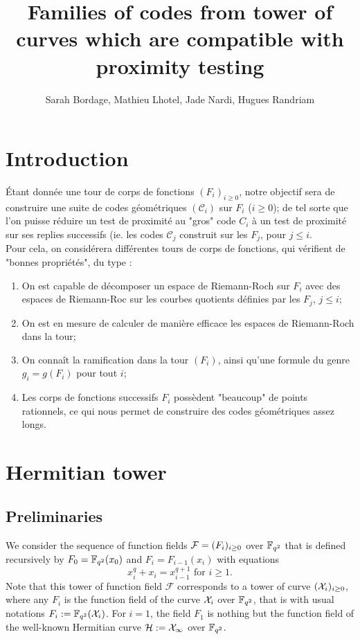 \documentclass[10pt]{article}
\title{Families of codes from tower of curves which are compatible with proximity testing}
\author{Sarah Bordage, Mathieu Lhotel, Jade Nardi, Hugues Randriam}
\begin{document}
\maketitle

\section{Introduction}

Étant donnée une tour de corps de fonctions $(F_i)_{i \geq 0}$, notre objectif sera de construire une suite de codes géométriques $(\mathcal{C}_i)$ sur $F_i$ ($i \geq 0$); de tel sorte que l'on puisse réduire un test de proximité au "gros" code $C_i$ à un test de proximité sur ses replies successifs (ie. les codes $\mathcal{C}_j$ construit sur les $F_j$, pour $j \leq i$. \\
Pour cela, on considérera différentes tours de corps de fonctions, qui vérifient de "bonnes propriétés", du type :
\begin{enumerate}
\item On est capable de décomposer un espace de Riemann-Roch sur $F_i$ avec des espaces de Riemann-Roc sur les courbes quotients définies par les $F_j$, $j \leq i$;
\item On est en mesure de calculer de manière efficace les espaces de Riemann-Roch dans la tour;
\item On connaît la ramification dans la tour $(F_i)$, ainsi qu'une formule du genre $g_i = g(F_i)$ pour tout $i$;
\item Les corps de fonctions successifs $F_i$ possèdent "beaucoup" de points rationnels, ce qui nous permet de construire des codes géométriques assez longs.
\end{enumerate}



\section{Hermitian tower}

\subsection{Preliminaries}

We consider the sequence of function fields $\mathcal{F}=(F_i)_{i\geq 0}$ over $\mathbb{F}_{q^2}$ that is defined recursively by $F_0=\mathbb{F}_{q^2}(x_0)$ and $F_i = F_{i-1}(x_i)$ with equations
\[x_i^q+x_{i} = x_{i-1}^{q+1} \text{ for } i\geq 1.\]
Note that this tower of function field $\mathcal{F}$ corresponds to a tower of curve
$(\mathcal{X}_i)_{i\geq 0}$, where any $F_i$ is the function field of the curve $\mathcal{X}_i$ over $\mathbb{F}_{q^2}$, that is with usual notations $F_i := \mathbb{F}_{q^2}(\mathcal{X}_i)$. 
For $i=1$, the field $F_1$ is nothing but the function field of the well-known Hermitian curve $\mathcal{H}:= \cal{X}_1$ over $\mathbb{F}_{q^2}$.
\end{document}
